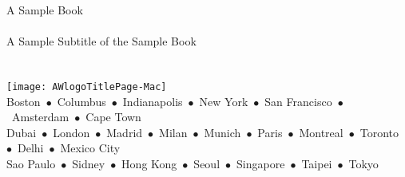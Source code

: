 \thispagestyle{empty}
\begin{center}
{\sfititle A \Cpp{} Sample Book}\\
 \\
\vspace*{54pt}
{\sfihalftitle A Sample Subtitle of the Sample Book}\\
\vspace*{\fill}    %
\\[3ex]
\\        %

\vspace*{\fill}    %
\texttt{[image: AWlogoTitlePage-Mac]}\\   %
{\footnotesize 
Boston~$\bullet$~Columbus~$\bullet$~Indianapolis~$\bullet$~New York~$\bullet$~San Francisco~$\bullet$~Amsterdam~$\bullet$~Cape Town\\[1ex]
Dubai~$\bullet$~London~$\bullet$~Madrid~$\bullet$~Milan~$\bullet$~Munich~$\bullet$~Paris~$\bullet$~Montreal~$\bullet$~Toronto~$\bullet$~Delhi~$\bullet$~Mexico City\\[1ex]
Sao Paulo~$\bullet$~Sidney~$\bullet$~Hong Kong~$\bullet$~Seoul~$\bullet$~Singapore~$\bullet$~Taipei~$\bullet$~Tokyo\\[1ex]
}
\end{center}
